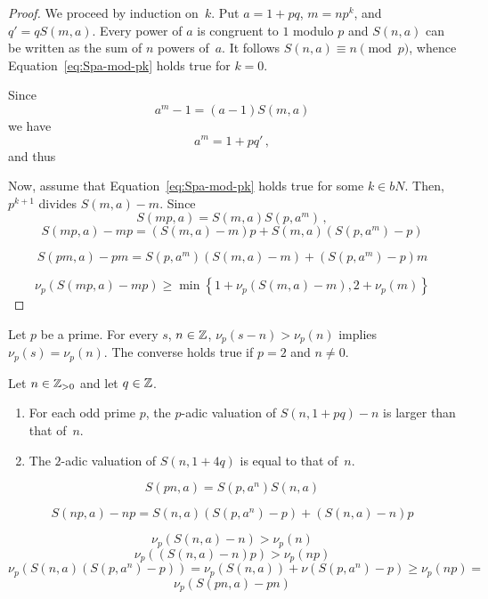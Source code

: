  \begin{proof}
   We proceed by induction on~$k$.
   Put $a = 1 + p q$,  $m = n p^k$, and $q' = q S(m, a)$.
   Every power of $a$ is congruent to $1$ modulo $p$
   and
   $S(n, a)$ can be written as the sum of $n$ powers of~$a$.
   It follows $S(n, a) \equiv n \pmod {p}$, whence
   Equation~\eqref{eq:Spa-mod-pk} holds true for $k = 0$.

   Since  
   $$
   a^m - 1 = (a - 1) S(m, a) 
   $$
   we have 
   $$
   a^m  = 1 + p q'  \,, 
   $$
   and thus
   
   Now, assume that Equation~\eqref{eq:Spa-mod-pk} holds true for some $k \in bN$.
   Then, $p^{k + 1}$ divides $S(m, a) - m$.
   Since
   $$
   S(m p, a) = S(m, a) S(p, a^m) \, , 
   $$
   $$
   S(m p, a) - m p = (S(m, a) - m) p + S(m, a)(S(p, a^m) - p) 
   $$

   $$
   S(p m, a) - p m = S(p, a^m)(S(m, a) - m) + (S(p, a^m) - p) m
   $$
   
   $$
   \nu_p(S(m p, a) - m p) \ge  \min \left\{ 1 + \nu_p(S(m, a) - m), 2 + \nu_p(m)  \right\}
   $$
 \end{proof}
   


 Let $p$ be a prime.
 For every $s$, $n \in \mathbb{Z}$, 
 $\nu_p(s - n) > \nu_p(n)$ implies $\nu_p(s) = \nu_p(n)$.
 The converse holds true if $p = 2$ and $n \ne 0$.

 \begin{theorem} \label{thm:val-adic}
   Let $n \in \mathbb{Z}_{> 0}$ and let $q \in \mathbb{Z}$.
   \begin{enumerate}
   \item For each odd prime $p$, the $p$-adic valuation of $S(n, 1 + p q) - n$ is larger than that of~$n$.
   \item The $2$-adic valuation of $S(n, 1 + 4 q)$ is equal to that of~$n$.
   \end{enumerate} 
 \end{theorem}

 $$
 S(p n, a) = S(p, a^n) S(n, a) 
 $$

 $$
 S(np, a)  - np =  S(n, a) (S(p, a^n) - p) + (S(n, a) - n) p
 $$

 $$
 \nu_p(S(n, a) - n) > \nu_p(n) 
 $$
 $$
 \nu_p((S(n, a) - n) p) > \nu_p(np) 
 $$
 $$
\nu_p( S(n, a) (S(p, a^n) - p) ) = \nu_p(S(n, a)) + \nu(S(p, a^n) - p) \ge \nu_p(np) = 
 $$
 $$
 \nu_p(S(pn, a) - pn) 
 $$

 
